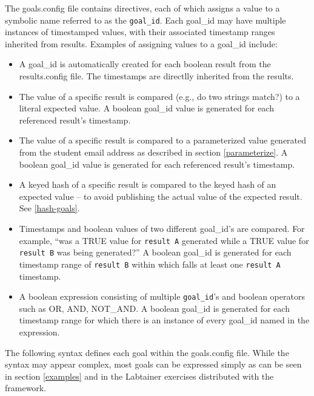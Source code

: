 \documentclass[12pt]{article}
\begin{document}
The goals.config file contains directives, each of which assigns a value to a symbolic name referred
to as the {\tt goal\_id}.  Each goal\_id may have multiple instances of timestamped values, with their
associated timestamp ranges inherited from results.  Examples of assigning values to a goal\_id include:
\begin{itemize}
\item A goal\_id is automatically created for each boolean result from the results.config file.  The timestamps
are directlly inherited from the results.

\item The value of a specific result is compared (e.g., do two strings match?) to a literal expected value.
A boolean goal\_id value is generated for each referenced result's timestamp.

\item The value of a specific result is compared to a parameterized value
generated from the student email address as described in section \ref{parameterize}.
A boolean goal\_id value is generated for each referenced result's timestamp.

\item A keyed hash of a specific result is compared to the keyed hash of an expected value -- to avoid
publishing the actual value of the expected result.  See \ref{hash-goals}.

\item Timestamps and boolean values of two different goal\_id's are compared.  For example, ``was
a TRUE value for {\tt result A} generated while a TRUE value for {\tt result B} was being generated?''  
A boolean goal\_id is generated for each
timestamp range of {\tt result B} within which falls at least one {\tt result A} timestamp.

\item A boolean expression consisting of multiple {\tt goal\_id}'s and boolean operators such as OR, AND, NOT\_AND.
A boolean goal\_id is generated for each timestamp range for which there is an instance of every goal\_id named
in the expression.
\end{itemize}

The following syntax defines each goal within the goals.config file.  While the syntax
may appear complex, most goals can be expressed simply as can be seen in section \ref{examples} and
in the Labtainer exercises distributed with the framework.
\end{document}
